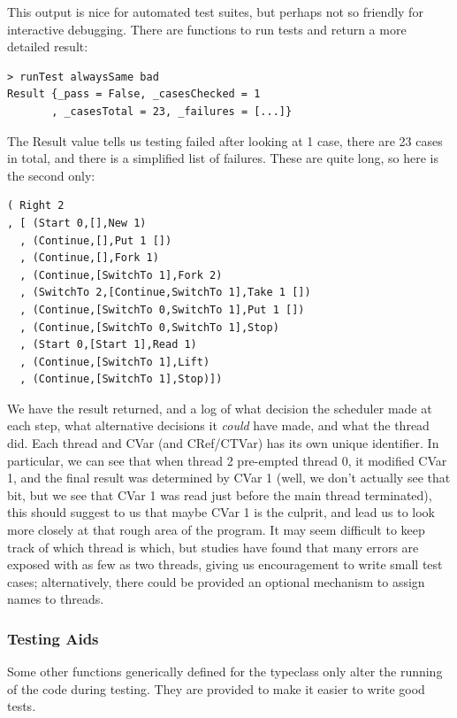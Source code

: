 This output is nice for automated test suites, but perhaps not so
friendly for interactive debugging. There are functions to run tests
and return a more detailed result:

\begin{verbatim}
> runTest alwaysSame bad
Result {_pass = False, _casesChecked = 1
       , _casesTotal = 23, _failures = [...]}
\end{verbatim}

The Result value tells us testing failed after looking at 1 case,
there are 23 cases in total, and there is a simplified list of
failures. These are quite long, so here is the second only:

\begin{verbatim}
( Right 2
, [ (Start 0,[],New 1)
  , (Continue,[],Put 1 [])
  , (Continue,[],Fork 1)
  , (Continue,[SwitchTo 1],Fork 2)
  , (SwitchTo 2,[Continue,SwitchTo 1],Take 1 [])
  , (Continue,[SwitchTo 0,SwitchTo 1],Put 1 [])
  , (Continue,[SwitchTo 0,SwitchTo 1],Stop)
  , (Start 0,[Start 1],Read 1)
  , (Continue,[SwitchTo 1],Lift)
  , (Continue,[SwitchTo 1],Stop)])
\end{verbatim}

We have the result returned, and a log of what decision the scheduler
made at each step, what alternative decisions it \textit{could} have
made, and what the thread did. Each thread and CVar (and CRef/CTVar)
has its own unique identifier. In particular, we can see that when
thread 2 pre-empted thread 0, it modified CVar 1, and the final result
was determined by CVar 1 (well, we don't actually see that bit, but we
see that CVar 1 was read just before the main thread terminated), this
should suggest to us that maybe CVar 1 is the culprit, and lead us to
look more closely at that rough area of the program. It may seem
difficult to keep track of which thread is which, but studies have
found\cite{empirical} that many errors are exposed with as few as two
threads, giving us encouragement to write small test cases;
alternatively, there could be provided an optional mechanism to assign
names to threads.

\subsubsection*{Testing Aids}
\label{sec:prelims-dejafu-testing-aids}

Some other functions generically defined for the typeclass only alter
the running of the code during testing. They are provided to make it
easier to write good tests.

